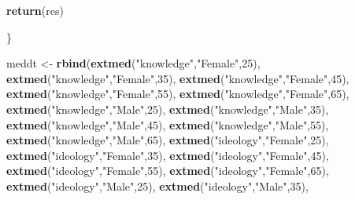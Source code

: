 \documentclass[
]{article}
\newenvironment{Shaded}{\begin{snugshade}}{\end{snugshade}}
\newcommand{\DecValTok}[1]{\textcolor[rgb]{0.00,0.00,0.81}{#1}}
\newcommand{\KeywordTok}[1]{\textcolor[rgb]{0.13,0.29,0.53}{\textbf{#1}}}
\newcommand{\NormalTok}[1]{#1}
\newcommand{\StringTok}[1]{\textcolor[rgb]{0.31,0.60,0.02}{#1}}
\begin{document}
\begin{Shaded}
\begin{Highlighting}[]
  \KeywordTok{return}\NormalTok{(res)}

\NormalTok{\}}

\NormalTok{meddt <-}\StringTok{ }\KeywordTok{rbind}\NormalTok{(}\KeywordTok{extmed}\NormalTok{(}\StringTok{"knowledge"}\NormalTok{,}\StringTok{"Female"}\NormalTok{,}\DecValTok{25}\NormalTok{),}
               \KeywordTok{extmed}\NormalTok{(}\StringTok{"knowledge"}\NormalTok{,}\StringTok{"Female"}\NormalTok{,}\DecValTok{35}\NormalTok{),}
               \KeywordTok{extmed}\NormalTok{(}\StringTok{"knowledge"}\NormalTok{,}\StringTok{"Female"}\NormalTok{,}\DecValTok{45}\NormalTok{),}
               \KeywordTok{extmed}\NormalTok{(}\StringTok{"knowledge"}\NormalTok{,}\StringTok{"Female"}\NormalTok{,}\DecValTok{55}\NormalTok{),}
               \KeywordTok{extmed}\NormalTok{(}\StringTok{"knowledge"}\NormalTok{,}\StringTok{"Female"}\NormalTok{,}\DecValTok{65}\NormalTok{),}
               \KeywordTok{extmed}\NormalTok{(}\StringTok{"knowledge"}\NormalTok{,}\StringTok{"Male"}\NormalTok{,}\DecValTok{25}\NormalTok{),}
               \KeywordTok{extmed}\NormalTok{(}\StringTok{"knowledge"}\NormalTok{,}\StringTok{"Male"}\NormalTok{,}\DecValTok{35}\NormalTok{),}
               \KeywordTok{extmed}\NormalTok{(}\StringTok{"knowledge"}\NormalTok{,}\StringTok{"Male"}\NormalTok{,}\DecValTok{45}\NormalTok{),}
               \KeywordTok{extmed}\NormalTok{(}\StringTok{"knowledge"}\NormalTok{,}\StringTok{"Male"}\NormalTok{,}\DecValTok{55}\NormalTok{),}
               \KeywordTok{extmed}\NormalTok{(}\StringTok{"knowledge"}\NormalTok{,}\StringTok{"Male"}\NormalTok{,}\DecValTok{65}\NormalTok{),}
               \KeywordTok{extmed}\NormalTok{(}\StringTok{"ideology"}\NormalTok{,}\StringTok{"Female"}\NormalTok{,}\DecValTok{25}\NormalTok{),}
               \KeywordTok{extmed}\NormalTok{(}\StringTok{"ideology"}\NormalTok{,}\StringTok{"Female"}\NormalTok{,}\DecValTok{35}\NormalTok{),}
               \KeywordTok{extmed}\NormalTok{(}\StringTok{"ideology"}\NormalTok{,}\StringTok{"Female"}\NormalTok{,}\DecValTok{45}\NormalTok{),}
               \KeywordTok{extmed}\NormalTok{(}\StringTok{"ideology"}\NormalTok{,}\StringTok{"Female"}\NormalTok{,}\DecValTok{55}\NormalTok{),}
               \KeywordTok{extmed}\NormalTok{(}\StringTok{"ideology"}\NormalTok{,}\StringTok{"Female"}\NormalTok{,}\DecValTok{65}\NormalTok{),}
               \KeywordTok{extmed}\NormalTok{(}\StringTok{"ideology"}\NormalTok{,}\StringTok{"Male"}\NormalTok{,}\DecValTok{25}\NormalTok{),}
               \KeywordTok{extmed}\NormalTok{(}\StringTok{"ideology"}\NormalTok{,}\StringTok{"Male"}\NormalTok{,}\DecValTok{35}\NormalTok{),}

\end{Highlighting}
\end{Shaded}
\end{document}
